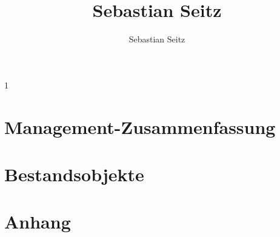 \documentclass[11pt, a4paper, oneside]{article}
\title{\textbf{Sebastian Seitz}}
\author{Sebastian Seitz}
\newcounter{SeitenzahlSpeicher}
\begin{document}
\keepXColumns





\setcounter{page}{2}

\begin{spacing}{1}

    \tableofcontents


    \listoffigures


    \listoftables

\end{spacing}

\setlength{\parskip}{0em}

\newpage

\setcounter{SeitenzahlSpeicher}{\value{page}}
\setcounter{table}{0}
 

\section{Management-Zusammenfassung} \label{sec:ManagementSummary}







\clearpage
\newpage

\section{Bestandsobjekte} \label{sec:Bestandsobjekte}




\label{lastPage2}
\clearpage


\appendix
\clearpage

\section{Anhang}
\end{document}
